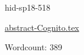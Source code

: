 








\begin{IU}

hid-sp18-518

\href{https://github.com/cloudmesh-community/hid-sp18-518/blob/master//technology/abstract-Cognito.tex}{abstract-Cognito.tex}

 

Wordcount: 389

\end{IU}

